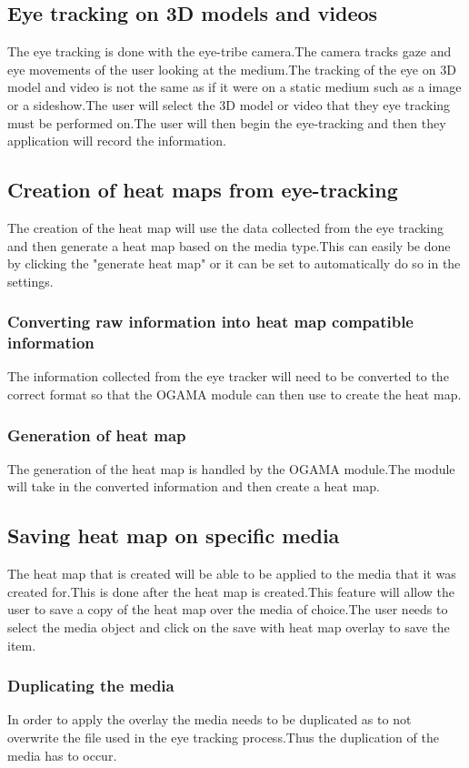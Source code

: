 \subsection{Eye tracking on 3D models and videos}
The eye tracking is done with the eye-tribe camera.The camera tracks gaze and eye movements of the user looking at the medium.The tracking of the eye on 3D model and video is not the same as if it were on a static medium such as a image or a sideshow.The user will select the 3D model or video that they eye tracking must be performed on.The user will then begin the eye-tracking and then they application will record the information.

\subsection{Creation of heat maps from eye-tracking}
The creation of the heat map will use the data collected from the eye tracking and then generate a heat map based on the media type.This can easily be done by clicking the "generate heat map" or it can be set to automatically do so in the settings.
\subsubsection{Converting raw information into heat map compatible information}
The information collected from the eye tracker will need to be converted to the correct format so that the OGAMA module can then use to create the heat map.
\subsubsection{Generation of heat map}
The generation of the heat map is handled by the OGAMA module.The module will take in the converted information and then create a heat map.
\subsection{Saving heat map on specific media}
The heat map that is created will be able to be applied to the media that it was created for.This is done after the heat map is created.This feature will allow the user to save a copy of the heat map over the media of choice.The user needs to select the media object and click on the save with heat map overlay to save the item.
\subsubsection{Duplicating the media}
In order to apply the overlay the media needs to be duplicated as to not overwrite the file used in the eye tracking process.Thus the duplication of the media has to occur.
